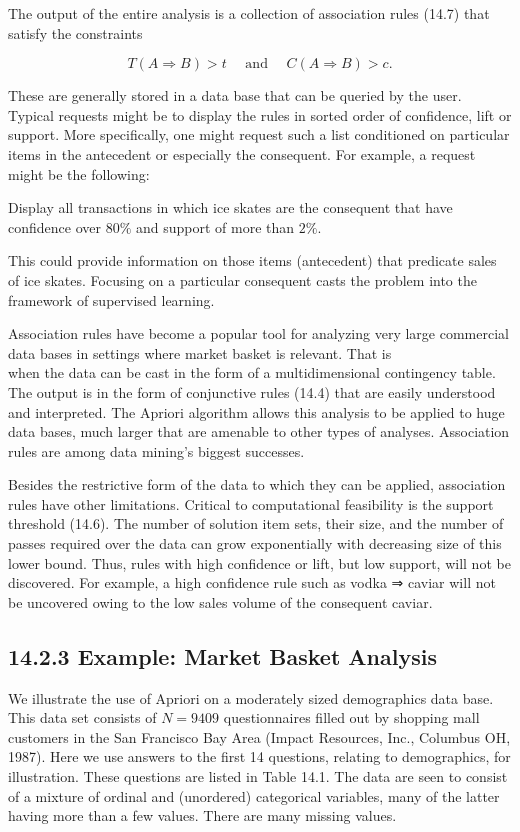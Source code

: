 \documentclass[10pt]{article}
\begin{document}
The output of the entire analysis is a collection of association rules (14.7) that satisfy the constraints

$$
T(A \Rightarrow B)>t \quad \text { and } \quad C(A \Rightarrow B)>c .
$$

These are generally stored in a data base that can be queried by the user. Typical requests might be to display the rules in sorted order of confidence, lift or support. More specifically, one might request such a list conditioned on particular items in the antecedent or especially the consequent. For example, a request might be the following:

\begin{displayquote}
Display all transactions in which ice skates are the consequent that have confidence over $80 \%$ and support of more than $2 \%$.
\end{displayquote}

This could provide information on those items (antecedent) that predicate sales of ice skates. Focusing on a particular consequent casts the problem into the framework of supervised learning.

Association rules have become a popular tool for analyzing very large commercial data bases in settings where market basket is relevant. That is\\
when the data can be cast in the form of a multidimensional contingency table. The output is in the form of conjunctive rules (14.4) that are easily understood and interpreted. The Apriori algorithm allows this analysis to be applied to huge data bases, much larger that are amenable to other types of analyses. Association rules are among data mining's biggest successes.

Besides the restrictive form of the data to which they can be applied, association rules have other limitations. Critical to computational feasibility is the support threshold (14.6). The number of solution item sets, their size, and the number of passes required over the data can grow exponentially with decreasing size of this lower bound. Thus, rules with high confidence or lift, but low support, will not be discovered. For example, a high confidence rule such as vodka ⇒ caviar will not be uncovered owing to the low sales volume of the consequent caviar.

\subsection*{14.2.3 Example: Market Basket Analysis}
We illustrate the use of Apriori on a moderately sized demographics data base. This data set consists of $N=9409$ questionnaires filled out by shopping mall customers in the San Francisco Bay Area (Impact Resources, Inc., Columbus OH, 1987). Here we use answers to the first 14 questions, relating to demographics, for illustration. These questions are listed in Table 14.1. The data are seen to consist of a mixture of ordinal and (unordered) categorical variables, many of the latter having more than a few values. There are many missing values.
\end{document}
